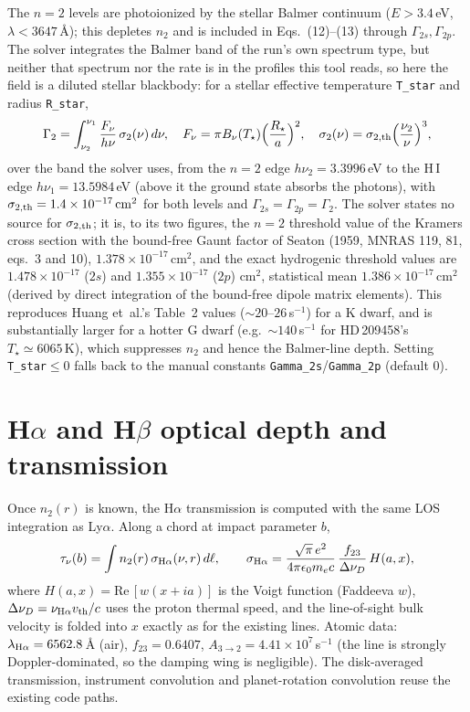 \documentclass[english,a4paper]{my_memo}
\begin{document}
The $n=2$ levels are photoionized by the stellar Balmer continuum
($E>3.4$\,eV, $\lambda<3647$\,\AA{}); this depletes $n_2$ and is included
in Eqs.~(12)--(13) through $\Gamma_{2s},\Gamma_{2p}$. The solver
integrates the Balmer band of the run's own spectrum type, but neither
that spectrum nor the rate is in the profiles this tool reads, so here the
field is a diluted stellar blackbody: for a stellar effective temperature
\texttt{T\_star} and radius \texttt{R\_star},
\[
  \Gamma_2 = \int_{\nu_2}^{\nu_1}\frac{F_\nu}{h\nu}\,\sigma_2(\nu)\,d\nu,
  \quad F_\nu = \pi B_\nu(T_\star)\Bigl(\frac{R_\star}{a}\Bigr)^2,
  \quad \sigma_2(\nu)=\sigma_{2,\rm th}\Bigl(\frac{\nu_2}{\nu}\Bigr)^{3},
\]
over the band the solver uses, from the $n=2$ edge $h\nu_2 = 3.3996$\,eV
to the H\,I edge $h\nu_1 = 13.5984$\,eV (above it the ground state absorbs
the photons), with $\sigma_{2,\rm th}=1.4\times10^{-17}\,\mathrm{cm^2}$ for
both levels and $\Gamma_{2s}=\Gamma_{2p}=\Gamma_2$. The solver states no
source for $\sigma_{2,\rm th}$; it is, to its two figures, the $n=2$
threshold value of the Kramers cross section with the bound-free Gaunt
factor of Seaton (1959, MNRAS 119, 81, eqs.~3 and 10),
$1.378\times10^{-17}\,\mathrm{cm^2}$, and the exact hydrogenic threshold
values are $1.478\times10^{-17}$ ($2s$) and $1.355\times10^{-17}$ ($2p$)
cm$^2$, statistical mean $1.386\times10^{-17}\,\mathrm{cm^2}$ (derived by
direct integration of the bound-free dipole matrix elements).
This reproduces Huang et~al.'s Table~2 values ($\sim20$--$26\,$s$^{-1}$)
for a K dwarf, and is substantially larger for a hotter G dwarf
(e.g.\ $\sim140\,$s$^{-1}$ for HD\,209458's $T_\star\simeq6065\,$K), which
suppresses $n_2$ and hence the Balmer-line depth. Setting
\texttt{T\_star}$\le0$ falls back to the manual constants
\texttt{Gamma\_2s}/\texttt{Gamma\_2p} (default $0$).

\section{H$\alpha$ and H$\beta$ optical depth and transmission}

Once $n_2(r)$ is known, the H$\alpha$ transmission is computed with the
same LOS integration as Ly$\alpha$. Along a chord at impact parameter $b$,
\[
  \tau_\nu(b) = \int n_2(r)\,\sigma_{\rm H\alpha}(\nu,r)\,d\ell,
  \qquad
  \sigma_{\rm H\alpha} = \frac{\sqrt{\pi}\,e^2}{4\pi\epsilon_0 m_e c}\,
  \frac{f_{23}}{\Delta\nu_D}\,H(a,x),
\]
where $H(a,x)=\mathrm{Re}\,[w(x+ia)]$ is the Voigt function (Faddeeva
$w$), $\Delta\nu_D=\nu_{\rm H\alpha}v_{\rm th}/c$ uses the proton thermal
speed, and the line-of-sight bulk velocity is folded into $x$ exactly as
for the existing lines. Atomic data: $\lambda_{\rm H\alpha}=6562.8\,$\AA{}
(air), $f_{23}=0.6407$, $A_{3\to2}=4.41\times10^{7}\,$s$^{-1}$ (the line
is strongly Doppler-dominated, so the damping wing is negligible). The
disk-averaged transmission, instrument convolution and planet-rotation
convolution reuse the existing code paths.
\end{document}
